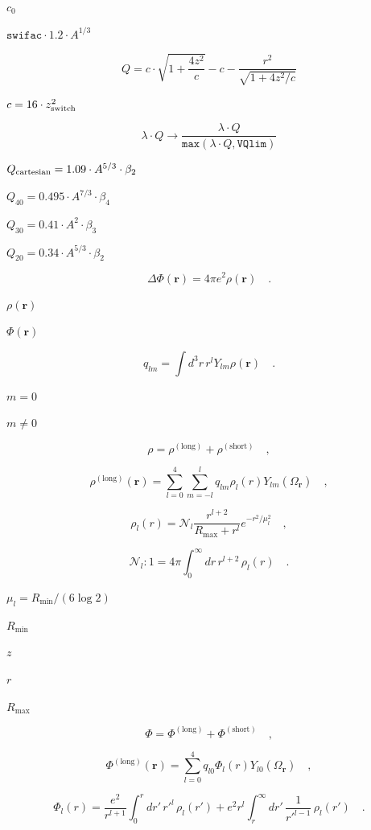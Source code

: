 \documentclass{article}
\begin{document}
$ c_0 $
\pagebreak

$ \texttt{swifac} \cdot 1.2 \cdot A^{1/3}$
\pagebreak

\[ Q=c\cdot \sqrt{1+\frac{4z^2}{c}}-c-\frac{r^2}{\sqrt{1+4z^2/c}} \]
\pagebreak

$ c=16\cdot z_{\rm switch}^2 $
\pagebreak

\[ \lambda \cdot Q \rightarrow \frac{\lambda \cdot Q}{\texttt{max}(\lambda \cdot Q,\texttt{VQlim})} \]
\pagebreak

$ Q_{\rm cartesian} = 1.09 \cdot A^{5/3} \cdot \beta_2 $
\pagebreak

$ Q_{40} = 0.495 \cdot A^{7/3} \cdot \beta_4 $
\pagebreak

$ Q_{30} = 0.41 \cdot A^{2} \cdot \beta_3 $
\pagebreak

$ Q_{20} = 0.34 \cdot A^{5/3} \cdot \beta_2 $
\pagebreak

\[\Delta\Phi(\mathbf{r}) = 4\pi e^2\rho(\mathbf{r}) \quad.\]
\pagebreak

$ \rho(\mathbf{r}) $
\pagebreak

$\Phi(\mathbf{r})$
\pagebreak

\[ q_{lm}=\int d^3r\,r^lY_{lm}\rho(\mathbf{r})\quad.\]
\pagebreak

$m=0$
\pagebreak

$m\neq 0$
\pagebreak

\[\rho=\rho^\mathrm{(long)}+\rho^\mathrm{(short)}\quad,\]
\pagebreak

\[ \rho^\mathrm{(long)}(\mathbf{r})=\sum_{l=0}^4\sum_{m=-l}^lq_{lm} \rho_l(r)Y_{lm}(\Omega_\mathbf{r})\quad,\]
\pagebreak

\[\rho_l(r)=\mathcal{N}_l\frac{r^{l+2}}{R_\mathrm{max}+r^l} e^{-r^2/\mu_l^2}\quad,\]
\pagebreak

\[\mathcal{N}_l: 1=4\pi\int_0^\infty dr\,r^{l+2}\,\rho_l(r)\quad.\]
\pagebreak

$\mu_l=R_\mathrm{min}/(6\log2)$
\pagebreak

$R_\mathrm{min}$
\pagebreak

$z$
\pagebreak

$r$
\pagebreak

$R_\mathrm{max}$
\pagebreak

\[\Phi=\Phi^\mathrm{(long)}+\Phi^\mathrm{(short)}\quad,\]
\pagebreak

\[\Phi^\mathrm{(long)}(\mathbf{r})=\sum_{l=0}^4q_{l0} \Phi_l(r)Y_{l0}(\Omega_\mathbf{r})\quad,\]
\pagebreak

\[\Phi_l(r)=\frac{e^2}{r^{l+1}}\int_0^r dr'\,{r'}^l\,\rho_l(r')+ e^2{r}^l\int_r^\infty dr'\,\frac{1}{{r'}^{l-1}}\,\rho_l(r')\quad.\]
\pagebreak
\end{document}
